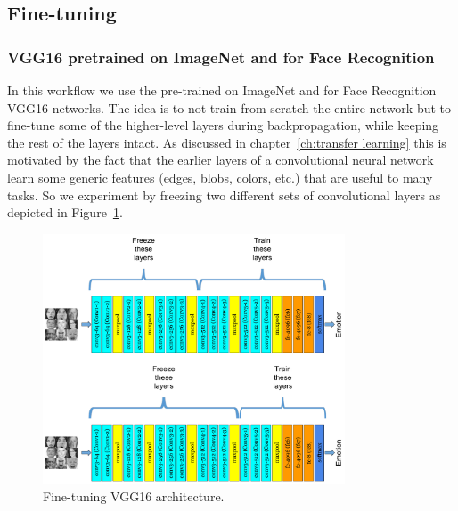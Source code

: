 \subsection{Fine-tuning}

\subsubsection{VGG16 pretrained on ImageNet and for Face Recognition}
In this workflow we use the pre-trained on ImageNet and for Face Recognition VGG16 networks. The idea is to not train from scratch the entire network but to fine-tune some of the higher-level layers during backpropagation, while keeping the rest of the layers intact. As discussed in chapter~\ref{ch:transfer learning} this is motivated by the fact that the earlier layers of a convolutional neural network learn some generic features (edges, blobs, colors, etc.) that are useful to many tasks. So we experiment by freezing two different sets of convolutional layers as depicted in Figure~\ref{VGG16_Finetuning}.

\begin{figure}[]
    \begin{center}
    \includegraphics[width=0.8\textwidth]{images/VGG16_Finetuning.pdf}
    \end{center}
    \caption{Fine-tuning VGG16 architecture.} \label{VGG16_Finetuning}
\end{figure}


